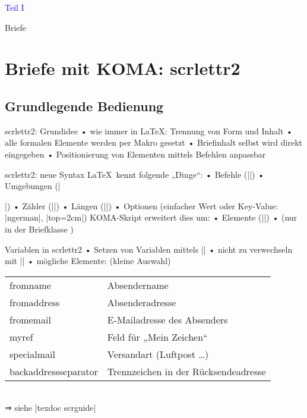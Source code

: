 



\begin{frame}[c]
\centerline{\large \textcolor{blue}{Teil I}}
\centerline{Briefe}
\end{frame}

\section{Briefe mit KOMA: scrlettr2}
\subsection{Grundlegende Bedienung}

\begin{frame}{scrlettr2: Grundidee}
• wie immer in \LaTeX: Trennung von Form und Inhalt
• alle formalen Elemente werden per Makro gesetzt
• Briefinhalt selbst wird direkt eingegeben
• Positionierung von Elementen mittels Befehlen anpassbar
\•
\end{frame}

\begin{frame}[fragile]{scrlettr2: neue Syntax}
\LaTeX\ kennt folgende „Dinge“:
• Befehle (|\texttt{}|)
• Umgebungen (|\begin{abstract} \end{abstract}|)
• Zähler (|\thepage|)
• Längen (|\pageheight=3cm|)
• Optionen (einfacher Wert oder Key-Value: |ngerman|, |top=2cm|)
\•
KOMA-Skript erweitert dies um:
• Elemente (||) \pause
•  (nur in der Briefklasse )
\•
\end{frame}

\begin{frame}[fragile]{Variablen in scrlettr2}
• Setzen von Variablen mittels ||
• \alert{nicht zu verwechseln} mit |\KOMAoptions{}|
• mögliche Elemente: (kleine Auswahl)
\•

\begin{tabular}{>{\ttfamily}ll}\toprule
fromname & Absendername\\
fromaddress & Absenderadresse\\
fromemail & E-Mailadresse des Absenders\\\pause
myref & Feld für „Mein Zeichen“\\
specialmail & Versandart (Luftpost …)\\
backaddressseparator & Trennzeichen in der Rücksendeadresse\\\bottomrule
\end{tabular}\\[2ex]
⇒ siehe |texdoc scrguide|
\end{frame}

